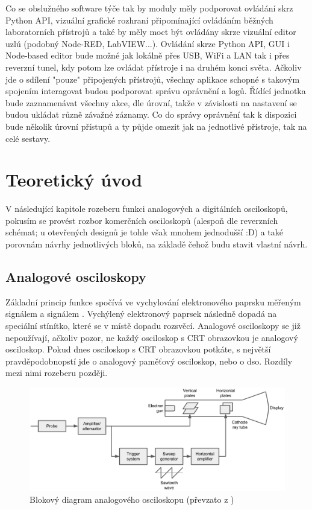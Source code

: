 \documentclass[12pt]{article}
\begin{document}
Co se obslužného software týče tak by moduly měly podporovat ovládání
skrz Python API, vizuální grafické rozhraní připomínající ovládáním běžných
laboratorních přístrojů a také by měly moct být ovládány skrze vizuální editor 
uzlú (podobný Node-RED, LabVIEW...). Ovládání skrze Python API, GUI i Node-based editor
bude možné jak lokálně přes USB, WiFi a LAN tak i přes reverzní tunel, kdy potom
lze ovládat přístroje i na druhém konci světa. Ačkoliv jde o sdílení "pouze" připojených
přístrojů, všechny aplikace schopné s takovým spojením interagovat budou podporovat
správu oprávnění a logů. Řídící jednotka bude zaznamenávat všechny akce, dle úrovní,
takže v závislosti na nastavení se budou ukládat různě závažné záznamy. Co do správy
oprávnění tak k dispozici bude několik úrovní přístupů a ty půjde omezit jak na
jednotlivé přístroje, tak na celé sestavy.

\newpage

\section{Teoretický úvod}

V následující kapitole rozeberu funkci analogových a digitálních osciloskopů, pokusím
se provést rozbor komerčních osciloskopů (alespoň dle reverzních schémat; u 
otevřených designů je tohle však mnohem jednodušší :D) a také porovnám
návrhy jednotlivých bloků, na základě čehož budu stavit vlastní návrh.

\subsection{Analogové osciloskopy} \label{sec:analog-osci}

Základní princip funkce spočívá ve vychylování elektronového paprsku měřeným
signálem a signálem . Vychýlený elektronový paprsek následně
dopadá na speciální stínítko, které se v místě dopadu rozsvěcí. Analogové
osciloskopy se již nepoužívají, ačkoliv pozor, ne každý osciloskop s CRT obrazovkou
je analogový osciloskop. Pokud dnes osciloskop s CRT obrazovkou potkáte,
s největší pravděpodobnopstí jde o analogový paměťový osciloskop, nebo
o \acrfull{dso}. Rozdíly mezi nimi rozeberu později.

\begin{figure}[h]
    \centering
    \includegraphics[width=\textwidth]{analog-oscilloscope-diagram}
    \caption{Blokový diagram analogového osciloskopu (převzato z \cite{HowDoesOscilloscopea})}
    \label{fig:blok-analog-osci}
\end{figure}
\end{document}
